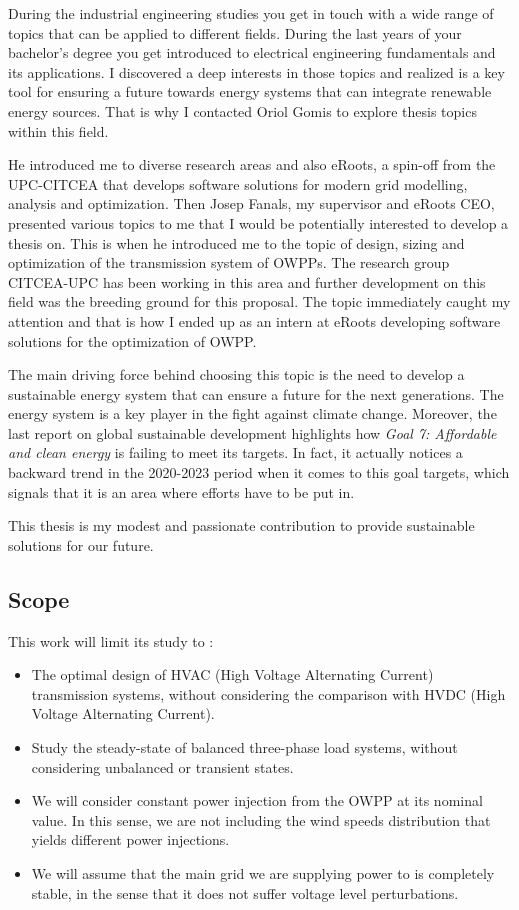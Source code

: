\documentclass[a4paper,11pt, titlepage, twoside]{article}
\begin{document}
During the industrial engineering studies you get in touch with a wide range of topics that can be applied
to different fields. During the last years of your bachelor's degree you get introduced to electrical engineering fundamentals and its 
applications. I discovered a deep interests in those topics and realized is a key tool for ensuring a future towards
energy systems that can integrate renewable energy sources. That is why I 
contacted Oriol Gomis to explore thesis topics within this field.\par

He introduced me to diverse research areas and also eRoots, a spin-off from the UPC-CITCEA
that develops software solutions for modern grid modelling, analysis and optimization. Then Josep Fanals, my supervisor
and eRoots CEO, presented various topics to me that I would be potentially interested to develop a thesis on. This is when 
he introduced me to the topic of design, sizing and optimization of the transmission system of OWPPs. The research 
group CITCEA-UPC has been working in this area \cite{paperbase} and further development on this field was the breeding ground for this proposal.
The topic immediately caught my attention and that is how I ended up as an intern at eRoots developing software solutions for the optimization of OWPP.


The main driving force behind choosing this topic is the need to develop a sustainable energy system that can
ensure a future for the next generations. The energy system is a key player in the fight against climate change. Moreover, the last
report on global sustainable development \cite{SustGoal7} highlights how \textit{Goal 7: Affordable and clean energy} is failing to meet its targets.
In fact, it actually notices a backward trend in the 2020-2023 period when it comes to this goal targets, which signals that it is an area where efforts
have to be put in. \par

This thesis is my modest and passionate contribution to provide sustainable solutions for our future.

\subsection{Scope}

This work will limit its study to :
\begin{itemize}
    \item The optimal design of HVAC (High Voltage Alternating Current) transmission systems, without considering the comparison with HVDC (High Voltage Alternating Current).
    \item Study the steady-state of balanced three-phase load systems, without considering unbalanced or transient states.
    \item We will consider constant power injection from the OWPP at its nominal value. In this sense, we are not including the wind speeds distribution that yields different 
    power injections.
    \item We will assume that the main grid we are supplying power to is completely stable, in the sense that it does not suffer voltage level perturbations.
\end{itemize}
\end{document}
